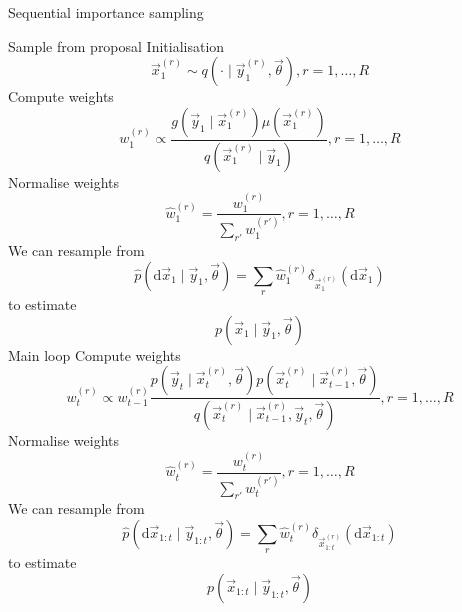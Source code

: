     \begin{algorithm}
    \caption{Sequential importance sampling}\label{alg:sis}
        \begin{algorithmic}[1]
            \State Sample from proposal \Comment Initialisation
                \begin{equation}
                    \vec x_1^{(r)} \sim q\left(\cdot \mid \vec y_1^{(r)}, \vec \theta\right), r = 1, \dotsc, R
                \end{equation}
            \State Compute weights
                \begin{equation}
                    w_1^{(r)} \propto \frac{g\left(\vec y_1 \mid \vec x^{(r)}_1\right) \mu\left(\vec x^{(r)}_1\right)}{q\left(\vec x_1^{(r)} \mid \vec y_1\right)}, r = 1, \dotsc, R
                \end{equation}
            \State Normalise weights
                \begin{equation}
                    \hat w_1^{(r)} = \frac{w_1^{(r)}}{\sum_{r'} w_1^{(r')}}, r = 1, \dotsc, R
                \end{equation}
            \State We can resample from 
                \begin{equation}
                    \hat p(\mathrm d \vec x_1 \mid \vec y_1, \vec \theta) = \sum_r \hat w_1^{(r)} \delta_{\vec x_1^{(r)}}(\mathrm d\vec x_1)
                \end{equation}
                to estimate
                \begin{equation}
                    p(\vec x_1 \mid \vec y_1, \vec \theta)
                \end{equation}
             \Comment Main loop
                \State Compute weights
                    \begin{equation}
                        w_t^{(r)} \propto w_{t - 1}^{(r)} \frac{p\left(\vec y_t \mid \vec x_t^{(r)}, \vec \theta\right) p\left(\vec x_t^{(r)} \mid \vec x_{t - 1}^{(r)}, \vec \theta \right)}{q\left(\vec x_t^{(r)} \mid \vec x_{t - 1}^{(r)}, \vec y_t, \vec \theta \right)}, r = 1, \dotsc, R
                    \end{equation}
                \State Normalise weights
                    \begin{equation}
                        \hat w_t^{(r)} = \frac{w_t^{(r)}}{\sum_{r'} w_t^{(r')}}, r = 1, \dotsc, R
                    \end{equation}
                \State We can resample from
                    \begin{equation}
                        \hat p(\mathrm d \vec x_{1:t} \mid \vec y_{1:t}, \vec \theta) = \sum_r \hat w_t^{(r)} \delta_{\vec x_{1:t}^{(r)}}(\mathrm d \vec x_{1:t})
                    \end{equation}
                    to estimate
                    \begin{equation}
                        p(\vec x_{1:t} \mid \vec y_{1:t}, \vec \theta)
                    \end{equation}
            \EndFor
        \end{algorithmic}
    \end{algorithm}

